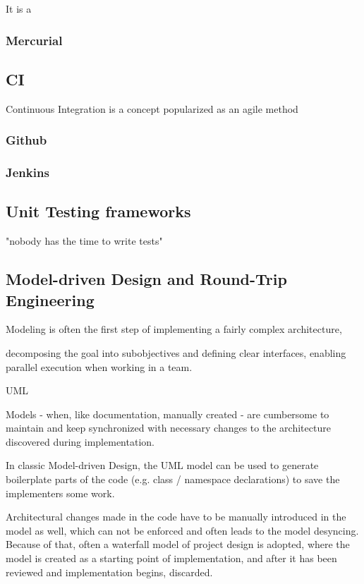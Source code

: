 It is a  
\subsubsection{Mercurial}

\subsection{CI}
Continuous Integration is a concept popularized as an \term agile method
\subsubsection{Github}

\subsubsection{Jenkins}


\subsection{Unit Testing frameworks}

"nobody has the time to write tests"

\subsection{Model-driven Design and Round-Trip Engineering}
Modeling is often the first step of implementing a fairly complex architecture, 

decomposing the goal into subobjectives and defining clear interfaces, enabling parallel execution when working in a team.

UML

Models - when, like documentation, manually created - are cumbersome to maintain and keep synchronized with necessary changes to the architecture discovered during implementation.

In classic Model-driven Design, the UML model can be used to generate boilerplate parts of the code (e.g. class / namespace declarations) to save the implementers some work.

Architectural changes made in the code have to be manually introduced in the model as well, which can not be enforced and often leads to the model desyncing. Because of that, often a waterfall model of project design is adopted, where the model is created as a starting point of implementation, and after it has been reviewed and implementation begins, discarded.


